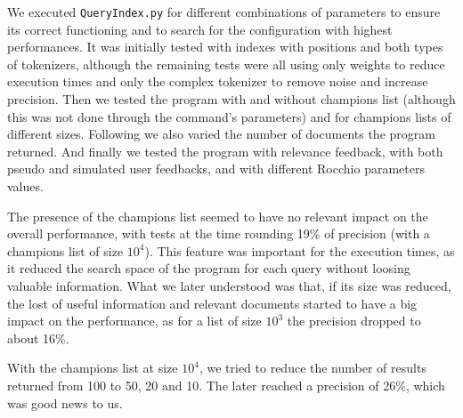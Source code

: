 \documentclass[12pt]{article}
\begin{document}
\newpage
We executed \texttt{QueryIndex.py} for different combinations of parameters to
ensure its correct functioning and to search for the configuration with highest 
performances.
It was initially tested with indexes with positions and both types of tokenizers, 
although the remaining tests were all using only weights to reduce execution times
and only the complex tokenizer to remove noise and increase precision.
Then we tested the program with and without champions list (although this was
not done through the command's parameters) and for champions lists of different sizes.
Following we also varied the number of documents the program returned.
And finally we tested the program with relevance feedback, with both pseudo and
simulated user feedbacks, and with different Rocchio parameters values.

The presence of the champions list seemed to have no relevant impact on the 
overall performance, with tests at the time rounding 19\% of precision
(with a champions list of size $10^4$).
This feature was important for the execution times, as it reduced the search 
space of the program for each query without loosing valuable information.
What we later understood was that, if its size was reduced, the lost of useful
information and relevant documents started to have a big impact on the performance,
as for a list of size $10^3$ the precision dropped to about 16\%.

With the champions list at size $10^4$, we tried to reduce the number of results
returned from 100 to 50, 20 and 10. 
The later reached a precision of 26\%, which was good news to us.
\end{document}
